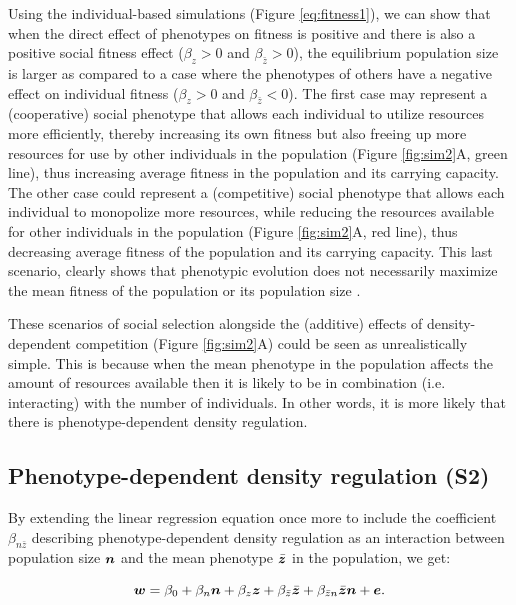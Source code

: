 \documentclass{article}
\begin{document}
Using the individual-based simulations (Figure \ref{eq:fitness1}), we can show that when the direct effect of phenotypes on fitness is positive and there is also a positive social fitness effect ($\beta_{z}>0$ and $\beta_{\bar{z}}>0$), the equilibrium population size is larger as compared to a case where the phenotypes of others have a negative effect on individual fitness ($\beta_{z}>0$ and $\beta_{\bar{z}}<0$). The first case may represent a (cooperative) social phenotype that allows each individual to utilize resources more efficiently, thereby increasing its own fitness but also freeing up more resources for use by other individuals in the population (Figure \ref{fig:sim2}A, green line), thus increasing average fitness in the population and its carrying capacity. The other case could represent a (competitive) social phenotype that allows each individual to monopolize more resources, while reducing the resources available for other individuals in the population (Figure \ref{fig:sim2}A, red line), thus decreasing average fitness of the population and its carrying capacity. This last scenario, clearly shows that phenotypic evolution does not necessarily maximize the mean fitness of the population or its population size \citep{Wright1969, Abrams1993}.

These scenarios of social selection alongside the (additive) effects of density-dependent competition (Figure \ref{fig:sim2}A) could be seen as unrealistically simple. This is because when the mean phenotype in the population affects the amount of resources available then it is likely to be in combination (i.e. interacting) with the number of individuals. In other words, it is more likely that there is phenotype-dependent density regulation. 

\subsection{Phenotype-dependent density regulation (S2)}

By extending the linear regression equation once more to include the coefficient $\beta_{n \bar{z}}$ describing phenotype-dependent density regulation as an interaction between population size $\vectorsym{n}$ and the mean phenotype $\bar{\vectorsym{z}}$ in the population, we get: 

\begin{equation} \label{eq: PDDR}
\vectorsym{w}=\beta_{0} +\beta_{n} \vectorsym{n} + \beta_{z} \vectorsym{z}+ \beta_{\bar{z}} \bar{\vectorsym{z}} + \beta_{\bar{z}n} \bar{\vectorsym{z}} \vectorsym{n}  +  \vectorsym{e}.
\end{equation}
\end{document}
